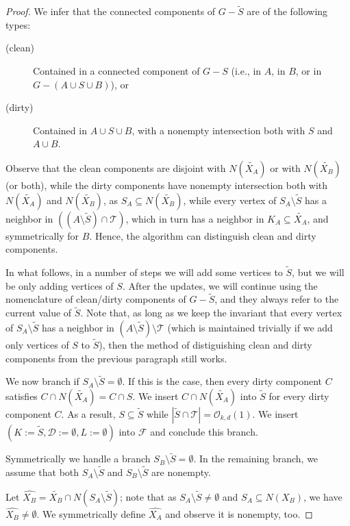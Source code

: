 \documentclass[11pt,a4paper]{article}
\theoremstyle{definition}
\newcommand{\Oh}{\mathcal{O}}
\def\T{\mathcal{T}}
\begin{document}
\begin{proof}
We infer that the connected components of $G-\widetilde{S}$ are of the following types:
\begin{description}
    \item[(clean)] Contained in a connected component of $G-S$ (i.e., in $A$, in $B$, or in $G-(A \cup S \cup B)$), or
    \item[(dirty)] Contained in $A \cup S \cup B$, with a nonempty intersection both with $S$
    and $A \cup B$. 
\end{description}
Observe that the clean components are disjoint with $N(\widetilde{X_A})$ or with 
$N(\widetilde{X_B})$ (or both), while the dirty components have nonempty intersection
both with $N(\widetilde{X_A})$ and $N(\widetilde{X_B})$,
as $S_A \subseteq N(\widetilde{X_B})$, 
while every vertex of $S_A \setminus \widetilde{S}$ has a neighbor in $((A \setminus \widetilde{S}) \cap \T)$, which in turn has a neighbor in $K_A \subseteq \widetilde{X_A}$,
and symmetrically for $B$. 
Hence, the algorithm can distinguish clean and dirty components. 

In what follows, in a number of steps we will add some vertices to $\widetilde{S}$,
but we will be only adding vertices of $S$. 
After the updates,
we will continue using the nomenclature of clean/dirty components of $G-\widetilde{S}$, 
and they always refer to the current value of $\widetilde{S}$. 
Note that, as long as we keep the invariant that every vertex of $S_A \setminus \widetilde{S}$
has a neighbor in $(A \setminus \widetilde{S}) \setminus \T$ (which is maintained trivially
if we add only vertices of $S$ to $\widetilde{S}$), then the method of distiguishing
clean and dirty components from the previous paragraph still works. 

We now branch if $S_A \setminus \widetilde{S} = \emptyset$. 
If this is the case, then
every dirty component $C$ satisfies $C \cap N(\widetilde{X_A}) = C \cap S$.
We insert $C \cap N(\widetilde{X_A})$ into $\widetilde{S}$ for every dirty component $C$. 
As a result, $S \subseteq \widetilde{S}$ while $|\widetilde{S} \cap \T| = \Oh_{k,d}(1)$. 
We insert $(K := \widetilde{S}, \mathcal{D} := \emptyset, L := \emptyset)$ into $\mathcal{F}$
and conclude this branch. 

Symmetrically we handle a branch $S_B \setminus \widetilde{S} = \emptyset$. 
In the remaining branch, we assume that both $S_A \setminus \widetilde{S}$ and
$S_B \setminus \widetilde{S}$ are nonempty. 

Let $\widehat{X_B}=\widetilde{X_B}\cap N(S_A\setminus \widetilde{S})$;
note that as $S_A \setminus \widetilde{S} \neq \emptyset$ and $S_A \subseteq N(X_B)$, 
we have $\widehat{X_B} \neq \emptyset$.
We symmetrically define $\widehat{X_A}$ and observe it is nonempty, too. 


\end{proof}
\end{document}
